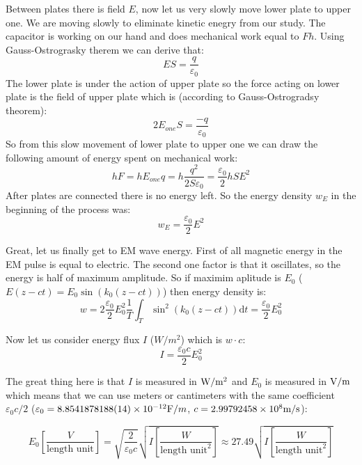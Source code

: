 \documentclass{article}
\begin{document}
Between plates there is field $E$, now let us very slowly move lower plate to upper one. We are moving slowly to eliminate kinetic enegry from our study. The capacitor is working on our hand and does mechanical work equal to $F h$.
Using Gauss-Ostrograsky therem we can derive that:
\[ E S = \frac{q} {\varepsilon_0} \]
The lower plate is under the action of upper plate so the force acting on lower plate is the field of upper plate which is (according to Gauss-Ostrogradsy theorem):
\[ 2 E_{one} S = \frac{-q} {\varepsilon_0} \]
So from this slow movement of lower plate to upper one we can draw the following amount of energy spent on mechanical work:
\[ h F = h E_{one} q = h \frac{q^2}{2S \varepsilon_0} = \frac{\varepsilon_0}{2} h S E^2 \]
After plates are connected there is no energy left. So the energy density $w_E$ in the beginning of the process was:
\[ w_E = \frac{\varepsilon_0}{2} E^2 \]

Great, let us finally get to EM wave energy. First of all magnetic energy in the EM pulse is equal to electric. The second one factor is that it oscillates, so the energy is half of maximum amplitude. So if maximim aplitude is $E_0$ ($E(z-ct) = E_0 \sin (k_0 (z - ct))$) then energy density is:
\[ w = 2 \frac{\varepsilon_0}{2} E_0^2 \frac{1}{T} \int_T \sin^2(k_0 (z-ct)) \mathrm{d} t = \frac{\varepsilon_0}{2} E_0^2 \]

Now let us consider energy flux $I$ ($W/m^2$) which is $w \cdot c$:
\[ I = \frac{\varepsilon_0 c}{2} E_0^2 \]

The great thing here is that $I$ is measured in $\text W/\text m^2$ and $E_0$ is measured in $\text V/ \text m$ which means that we can use meters or cantimeters with the same coefficient $\varepsilon_0 c / 2$ ($\varepsilon_0 = 8.8541878188(14) \times 10^{-12} \text F / m$, $c=2.99792458 \times 10^8 \text m / \text s$):

\[ E_0 \left[\frac{V}{\text{length unit}}\right] = \sqrt{\frac{2}{\varepsilon_0 c}} \sqrt{I \left[\frac{W}{\text{length unit}^2}\right]} \approx 27.49 \sqrt{I \left[\frac{W}{\text{length unit}^2}\right]} \]
\end{document}
